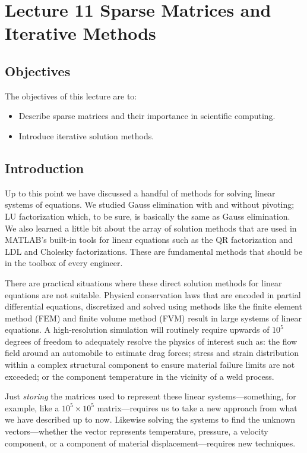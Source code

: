 \chapter{Lecture 11 Sparse Matrices and Iterative Methods}
\label{ch:lec11n}
\section{Objectives}
The objectives of this lecture are to:
\begin{itemize}
\item Describe sparse matrices and their importance in scientific computing.
\item Introduce iterative solution methods.
\end{itemize}
\setcounter{lstannotation}{0}

\section{Introduction}
Up to this point we have discussed a handful of methods for solving linear systems of equations.  We studied Gauss elimination with and without pivoting; LU factorization which, to be sure, is basically the same as Gauss elimination.  We also learned a little bit about the array of solution methods that are used in MATLAB's built-in tools for linear equations such as the QR factorization and LDL and Cholesky factorizations.  These are fundamental methods that should be in the toolbox of every engineer.

There are practical situations where these direct solution methods for linear equations are not suitable.  Physical conservation laws that are encoded in partial differential equations, discretized and solved using methods like the finite element method (FEM) and finite volume method (FVM) result in large systems of linear equations.  A high-resolution simulation will routinely require upwards of $10^5$ degrees of freedom to adequately resolve the physics of interest such as: the flow field around an automobile to estimate drag forces; stress and strain distribution within a complex structural component to ensure material failure limits are not exceeded; or the component temperature in the vicinity of a weld process.

Just \emph{storing} the matrices used to represent these linear systems---something, for example, like a $10^5 \times 10^5$ matrix---requires us to take a new approach from what we have described up to now.  Likewise solving the systems to find the unknown vectors---whether the vector represents temperature, pressure, a velocity component, or a component of material displacement---requires new techniques.

